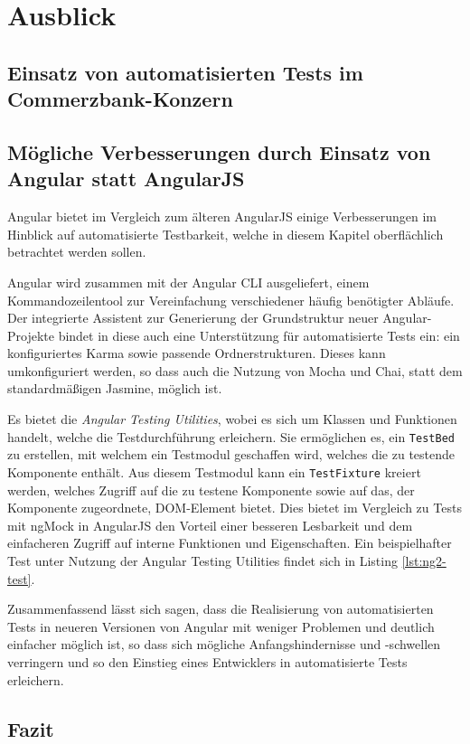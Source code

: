 \section{Ausblick}
\subsection{Einsatz von automatisierten Tests im Commerzbank-Konzern}


\subsection{Mögliche Verbesserungen durch Einsatz von Angular statt AngularJS}
Angular bietet im Vergleich zum älteren AngularJS einige Verbesserungen im Hinblick auf automatisierte Testbarkeit, welche in diesem Kapitel oberflächlich betrachtet werden sollen.

Angular wird zusammen mit der Angular CLI ausgeliefert, einem Kommandozeilentool zur Vereinfachung verschiedener häufig benötigter Abläufe. Der integrierte Assistent zur Generierung der Grundstruktur neuer Angular-Projekte bindet in diese auch eine Unterstützung für automatisierte Tests ein: ein konfiguriertes Karma sowie passende Ordnerstrukturen. Dieses kann umkonfiguriert werden, so dass auch die Nutzung von Mocha und Chai, statt dem standardmäßigen Jasmine, möglich ist.\cite{ng2-cli}

Es bietet die \textit{Angular Testing Utilities}, wobei es sich um Klassen und Funktionen handelt, welche die Testdurchführung erleichern. Sie ermöglichen es, ein \texttt{TestBed} zu erstellen, mit welchem ein Testmodul geschaffen wird, welches die zu testende Komponente enthält. Aus diesem Testmodul kann ein \texttt{TestFixture} kreiert werden, welches Zugriff auf die zu testene Komponente sowie auf das, der Komponente zugeordnete, DOM-Element bietet. Dies bietet im Vergleich zu Tests mit ngMock in AngularJS den Vorteil einer besseren Lesbarkeit und dem einfacheren Zugriff auf interne Funktionen und Eigenschaften. Ein beispielhafter Test unter Nutzung der Angular Testing Utilities findet sich in Listing \ref{lst:ng2-test}. \cite{ng2-test}

Zusammenfassend lässt sich sagen, dass die Realisierung von automatisierten Tests in neueren Versionen von Angular mit weniger Problemen und deutlich einfacher möglich ist, so dass sich mögliche Anfangshindernisse und -schwellen verringern und so den Einstieg eines Entwicklers in automatisierte Tests erleichern. 

\begin{figure}[H]
	
\end{figure}

\subsection{Fazit}
